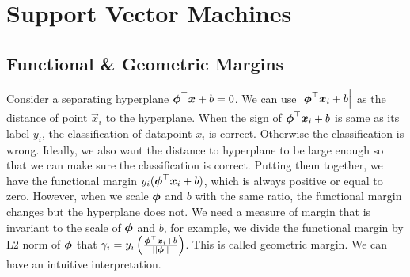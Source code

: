 
\graphicspath{{Chapter08/Figs/}}

\chapter{Support Vector Machines}
\label{chapter8}

\section{Functional \& Geometric Margins}

Consider a separating hyperplane $\boldsymbol{\phi}^\top\boldsymbol{x}+b=0$. We can use $\left\vert\boldsymbol{\phi}^\top\boldsymbol{x}_i+b\right\vert$ as the distance of point $\vec{x}_i$ to the hyperplane. When the sign of $\boldsymbol{\phi}^\top\boldsymbol{x}_i+b$ is same as its label $y_i$, the classification of datapoint $x_i$ is correct. Otherwise the classification is wrong. Ideally, we also want the distance to hyperplane to be large enough so that we can make sure the classification is correct. Putting them together, we have the functional margin $y_i(\boldsymbol{\phi}^\top\boldsymbol{x}_i+b)$, which is always positive or equal to zero. However, when we scale $\boldsymbol{\phi}$ and $b$ with the same ratio, the functional margin changes but the hyperplane does not. We need a measure of margin that is invariant to the scale of $\boldsymbol{\phi}$ and $b$, for example, we divide the functional margin by L2 norm of $\boldsymbol{\phi}$ that $\gamma_i=y_i\left(\frac{\boldsymbol{\phi}^\top\boldsymbol{x}_i+b}{\left\vert\left\vert \boldsymbol{\phi} \right\vert\right\vert}\right)$. This is called geometric margin. We can have an intuitive interpretation.

